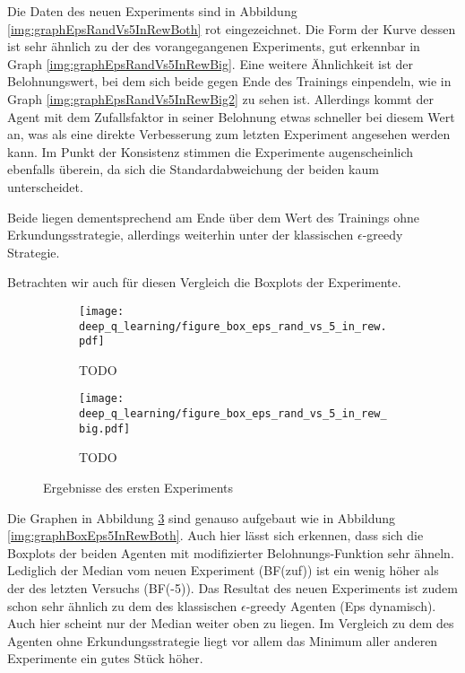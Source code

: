 Die Daten des neuen Experiments sind in Abbildung \ref{img:graphEpsRandVs5InRewBoth} rot eingezeichnet. Die Form der Kurve dessen ist sehr ähnlich zu der des vorangegangenen Experiments, gut erkennbar in Graph \ref{img:graphEpsRandVs5InRewBig}. Eine weitere Ähnlichkeit ist der Belohnungswert, bei dem sich beide gegen Ende des Trainings einpendeln, wie in Graph \ref{img:graphEpsRandVs5InRewBig2} zu sehen ist. Allerdings kommt der Agent mit dem Zufallsfaktor in seiner Belohnung etwas schneller bei diesem Wert an, was als eine direkte Verbesserung zum letzten Experiment angesehen werden kann. Im Punkt der Konsistenz stimmen die Experimente augenscheinlich ebenfalls überein, da sich die Standardabweichung der beiden kaum unterscheidet.

Beide liegen dementsprechend am Ende über dem Wert des Trainings ohne Erkundungsstrategie, allerdings weiterhin unter der klassischen $ \epsilon $-greedy Strategie.

Betrachten wir auch für diesen Vergleich die Boxplots der Experimente.

\begin{figure}[h!]
    \centering
    \begin{subfigure}[b]{0.7\textwidth}
        \texttt{[image: deep\_q\_learning/figure\_box\_eps\_rand\_vs\_5\_in\_rew.pdf]}
        \caption{TODO}
        \label{img:graphBoxEpsRandVs5InRew}
    \end{subfigure}
    \begin{subfigure}[b]{0.7\textwidth}
        \texttt{[image: deep\_q\_learning/figure\_box\_eps\_rand\_vs\_5\_in\_rew\_big.pdf]}
        \caption{TODO}
        \label{img:graphBoxEpsRandVs5InRewBig}
    \end{subfigure}
    \caption{Ergebnisse des ersten Experiments}
    \label{img:graphBoxEpsRandVs5InRewBoth}
\end{figure}

Die Graphen in Abbildung \ref{img:graphBoxEpsRandVs5InRewBoth} sind genauso aufgebaut wie in Abbildung \ref{img:graphBoxEps5InRewBoth}. Auch hier lässt sich erkennen, dass sich die Boxplots der beiden Agenten mit modifizierter Belohnungs-Funktion sehr ähneln. Lediglich der Median vom neuen Experiment (BF(zuf)) ist ein wenig höher als der des letzten Versuchs (BF(-5)). Das Resultat des neuen Experiments ist zudem schon sehr ähnlich zu dem des klassischen $ \epsilon $-greedy Agenten (Eps dynamisch). Auch hier scheint nur der Median weiter oben zu liegen. Im Vergleich zu dem des Agenten ohne Erkundungsstrategie liegt vor allem das Minimum aller anderen Experimente ein gutes Stück höher.

